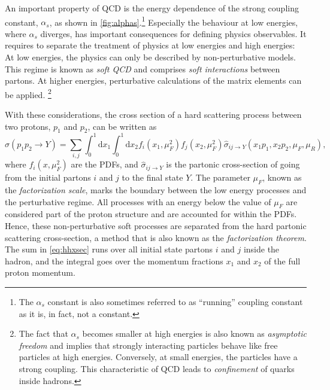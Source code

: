 An important property of QCD is the energy dependence of the strong coupling constant, $\alpha_s$, as shown in \cref{fig:alphas}.\footnote{The $\alpha_s$ constant is also sometimes referred to as ``running'' coupling constant as it is, in fact, not a constant.} 
Especially the behaviour at low energies, where $\alpha_s$ diverges, has important consequences for defining physics observables. It requires to separate the treatment of physics at low energies and high energies: At low energies, the physics can only be described by non-perturbative models. This regime is known as \emph{soft QCD} and comprises \emph{soft interactions} between partons.
At higher energies, perturbative calculations of the matrix elements can be applied. \footnote{The fact that $\alpha_s$ becomes smaller at high energies is also known as \emph{asymptotic freedom} and implies that strongly interacting particles behave like free particles at high energies. Conversely, at small energies, the particles have a strong coupling. This characteristic of QCD leads to \emph{confinement} of quarks inside hadrons.}

With these considerations, the cross section of a hard scattering process between two protons, $p_1$ and $p_2$, can be written as
\begin{equation}
  \sigma(p_1p_2 \to Y) = \sum_{i,j} \int_0^1 \mathrm{d}x_1 \int_0^1 \mathrm{d}x_2 f_i(x_1,\mu_F^2) f_j(x_2,\mu_F^2) \hat{\sigma}_{ij \rightarrow Y}(x_1p_1,x_2p_2,\mu_F,\mu_R), 
  \label{eq:hhxsec}
\end{equation}
where $f_i(x,\mu_F^2)$ are the PDFs, and $\hat{\sigma}_{ij \rightarrow Y}$ is the partonic cross-section of going from the initial partons $i$ and $j$ to the final state $Y$.
The parameter $\mu_F$, known as the \emph{factorization scale}, marks the boundary between the low energy processes and the perturbative regime. 
All processes with an energy below the value of $\mu_F$ are considered part of the proton structure and are accounted for within the PDFs. Hence, these non-perturbative soft processes are separated from the hard partonic scattering cross-section, a method that is also known as the \emph{factorization theorem}.
The sum in \cref{eq:hhxsec} runs over all initial state partons $i$ and $j$ inside the hadron, and the integral goes over the momentum fractions $x_1$ and $x_2$ of the full proton momentum.

